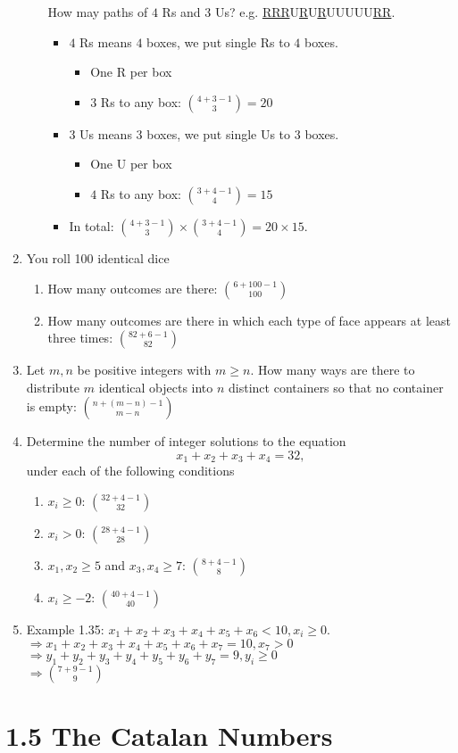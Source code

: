 \documentclass[a4paper]{article}
\begin{document}
\begin{enumerate}
\begin{enumerate}
        How may paths of $4$ Rs and $3$ Us? e.g. \underline{RRR}U\underline{R}U\underline{R}UUUUU\underline{RR}.
        \begin{itemize}
            \item $4$ Rs means $4$ boxes, we put single Rs to $4$ boxes.
            \begin{itemize}
                \item One R per box
                \item $3$ Rs to any box: $\binom{4+3-1}{3}=20$
            \end{itemize}
            \item $3$ Us means $3$ boxes, we put single Us to $3$ boxes.
            \begin{itemize}
                \item One U per box
                \item $4$ Rs to any box: $\binom{3+4-1}{4}=15$
            \end{itemize}
            \item In total: $\binom{4+3-1}{3}\times \binom{3+4-1}{4}=20\times 15$.
        \end{itemize}
    \end{enumerate}
    \item You roll 100 identical dice
    \begin{enumerate}
        \item How many outcomes are there: $\binom{6+100-1}{100}$
        \item How many outcomes are there in which each type of face appears at least three times: $\binom{82+6-1}{82}$
    \end{enumerate}
    \item Let $m,n$ be positive integers with $m\geq n$. How many ways are there to distribute $m$ identical objects into $n$ distinct containers so that no container is empty: $\binom{n+(m-n)-1}{m-n}$
    \item Determine the number of integer solutions to the equation
    $$
    x_1+x_2+x_3+x_4=32,
    $$
    under each of the following conditions
    \begin{enumerate}
        \item $x_i\geq 0$: $\binom{32+4-1}{32}$
        \item $x_i> 0$: $\binom{28+4-1}{28}$
        \item $x_1,x_2\geq 5$ and $x_3,x_4\geq 7$: $\binom{8+4-1}{8}$
        \item $x_i\geq -2$: $\binom{40+4-1}{40}$
    \end{enumerate}
    \item Example 1.35: $x_1+x_2+x_3+x_4+x_5+x_6<10,x_i\geq 0$.\\
    $\Rightarrow x_1+x_2+x_3+x_4+x_5+x_6+x_7=10,x_7>0$\\
    $\Rightarrow y_1+y_2+y_3+y_4+y_5+y_6+y_7=9,y_i\geq 0$\\
    $\Rightarrow \binom{7+9-1}{9}$
\end{enumerate}
\section*{1.5 The Catalan Numbers}
\end{document}
